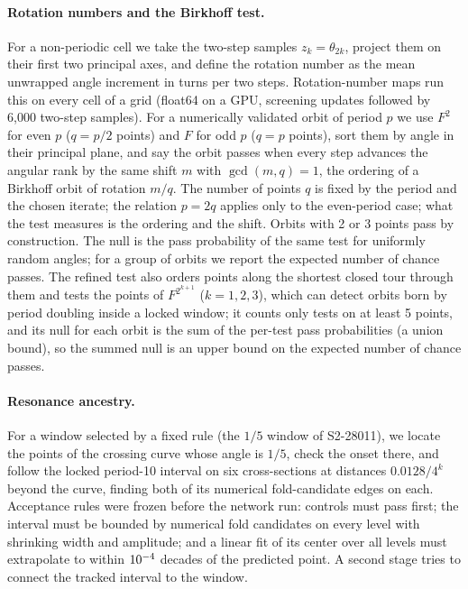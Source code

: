 \documentclass[11pt,letterpaper]{article}
\begin{document}
\paragraph{Rotation numbers and the Birkhoff test.} For a non-periodic cell we take the two-step samples
$z_k=\theta_{2k}$, project them on their first two principal axes, and define the rotation number as the mean
unwrapped angle increment in turns per two steps. Rotation-number maps run this on every cell of a grid (float64
on a GPU, \nUpdates{} screening updates followed by 6{,}000 two-step samples). For a numerically validated orbit of period $p$
we use $F^2$ for even $p$ ($q=p/2$ points) and $F$ for odd $p$ ($q=p$ points), sort them by angle in their principal
plane, and say the orbit passes when every step advances the angular rank by the same shift $m$ with $\gcd(m,q)=1$,
the ordering of a Birkhoff orbit of rotation $m/q$. The number of points $q$ is fixed by the period and the chosen iterate; the relation $p=2q$
applies only to the even-period case; what the test measures is the ordering and the shift. Orbits with 2 or 3 points pass by
construction. The null is the pass probability of the same test for uniformly random angles; for a group of orbits
we report the expected number of chance passes. The refined test also orders points along the shortest closed tour
through them and tests the points of $F^{2^{k+1}}$ ($k=1,2,3$), which can detect orbits born by period doubling
inside a locked window; it counts only tests on at least 5 points, and its null for each orbit is the sum of the
per-test pass probabilities (a union bound), so the summed null is an upper bound on the expected number of chance
passes.

\paragraph{Resonance ancestry.} For a window selected by a fixed rule (the $1/5$ window of S2-28011), we locate the
points of the crossing curve whose angle is $1/5$, check the onset there, and follow the locked period-10 interval
on six cross-sections at distances $0.0128/4^k$ beyond the curve, finding both of its numerical fold-candidate edges on each. Acceptance
rules were frozen before the network run: controls must pass first; the interval must be bounded by numerical fold candidates on every
level with shrinking width and amplitude; and a linear fit of its center over all levels must extrapolate to within
$10^{-4}$ decades of the predicted point. A second stage tries to connect the tracked interval to the window.
\end{document}
